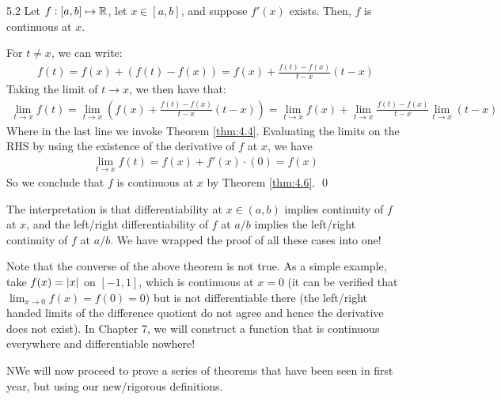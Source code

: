 \begin{theorem}{}{5.2}
    Let $f:[a,b] \mapsto \mathbb{R}$, let $x \in [a, b]$, and suppose $f'(x)$ exists. Then, $f$ is continuous at $x$.
\end{theorem}
\begin{nproof}
    For $t \neq x$, we can write:
    \begin{align*}
        f(t) = f(x) + (f(t) - f(x)) = f(x) + \frac{f(t) - f(x)}{t - x}(t - x)
    \end{align*}
    Taking the limit of $t \rightarrow x$, we then have that:
    \begin{align*}
        \lim_{t \rightarrow x} f(t) = \lim_{t \rightarrow x} \left(f(x) + \frac{f(t) - f(x)}{t - x}(t - x) \right) = \lim_{t \rightarrow x} f(x) + \lim_{t \rightarrow x} \frac{f(t) - f(x)}{t - x} \lim_{t \rightarrow x} (t - x)
    \end{align*}
    Where in the last line we invoke Theorem \ref{thm:4.4}. Evaluating the limits on the RHS by using the existence of the derivative of $f$ at $x$, we have
    \begin{align*}
        \lim_{t \rightarrow x} f(t) = f(x) + f'(x)\cdot (0) = f(x)
    \end{align*}
    So we conclude that $f$ is continuous at $x$ by Theorem \ref{thm:4.6}. \qed
\end{nproof}
The interpretation is that differentiability at $x \in (a, b)$ implies continuity of $f$ at $x$, and the left/right differentiability of $f$ at $a/b$ implies the left/right continuity of $f$ at $a/b$. We have wrapped the proof of all these cases into one!

Note that the converse of the above theorem is not true. As a simple example, take $f(x) = \abs{x}$ on $[-1, 1]$, which is continuous at $x = 0$ (it can be verified that $\lim_{x \rightarrow 0}f(x) = f(0) = 0$) but is not differentiable there (the left/right handed limits of the difference quotient do not agree and hence the derivative does not exist). In Chapter 7, we will construct a function that is continuous everywhere and differentiable nowhere!

NWe will now proceed to prove a series of theorems that have been seen in first year, but using our new/rigorous definitions.

